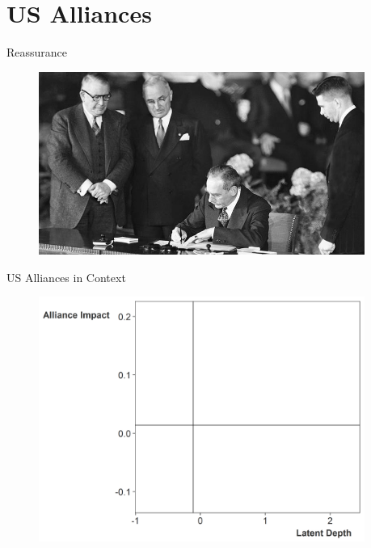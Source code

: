 \documentclass[12pt]{beamer}
\begin{document}

\section{US Alliances}


\begin{frame}{Reassurance}

\begin{figure}
	\centering
		\includegraphics[width=0.95\textwidth]{acheson-nato-sign.jpg}
	\label{fig:acheson-nato-sign}
\end{figure}


\end{frame}




\begin{frame}{US Alliances in Context} 

\begin{figure}
	\centering
		\includegraphics[width=0.95\textwidth]{lambda-depth-us-blank.png}
\end{figure}


 \end{frame}
 
\end{document}
